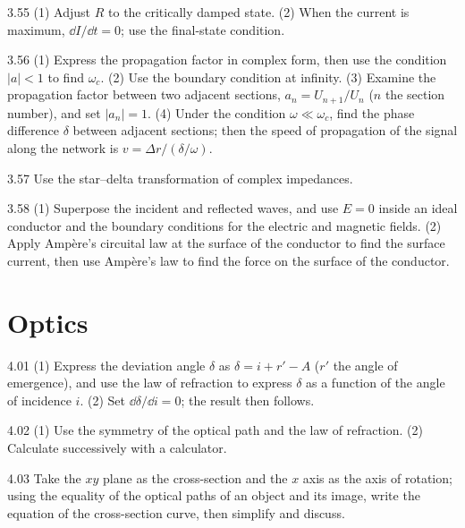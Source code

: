 \begin{hint}{3.55}
(1) Adjust $R$ to the critically damped state. (2) When the current is maximum, $\dd I/\dd t=0$; use the final-state condition.
\end{hint}

\begin{hint}{3.56}
(1) Express the propagation factor in complex form, then use the condition $|a|<1$ to find $\omega_c$. (2) Use the boundary condition at infinity. (3) Examine the propagation factor between two adjacent sections, $a_n=U_{n+1}/U_n$ ($n$ the section number), and set $|a_n|=1$. (4) Under the condition $\omega\ll\omega_c$, find the phase difference $\delta$ between adjacent sections; then the speed of propagation of the signal along the network is $v=\Delta r/(\delta/\omega)$.
\end{hint}

\begin{hint}{3.57}
Use the star--delta transformation of complex impedances.
\end{hint}

\begin{hint}{3.58}
(1) Superpose the incident and reflected waves, and use $E=0$ inside an ideal conductor and the boundary conditions for the electric and magnetic fields. (2) Apply Ampère's circuital law at the surface of the conductor to find the surface current, then use Ampère's law to find the force on the surface of the conductor.
\end{hint}

\section{Optics}

\begin{hint}{4.01}
(1) Express the deviation angle $\delta$ as $\delta=i+r'-A$ ($r'$ the angle of emergence), and use the law of refraction to express $\delta$ as a function of the angle of incidence $i$. (2) Set $\dd\delta/\dd i=0$; the result then follows.
\end{hint}

\begin{hint}{4.02}
(1) Use the symmetry of the optical path and the law of refraction. (2) Calculate successively with a calculator.
\end{hint}

\begin{hint}{4.03}
Take the $xy$ plane as the cross-section and the $x$ axis as the axis of rotation; using the equality of the optical paths of an object and its image, write the equation of the cross-section curve, then simplify and discuss.
\end{hint}

